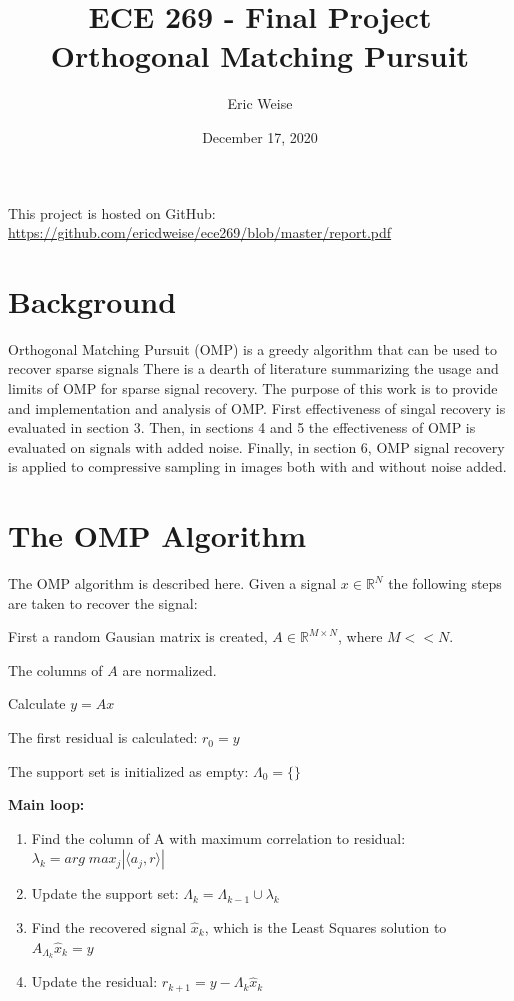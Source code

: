 \documentclass{article}
\title{ECE 269 - Final Project\\Orthogonal Matching Pursuit}
\author{Eric Weise}
\date{December 17, 2020}
\begin{document}
\maketitle

This project is hosted on GitHub:
\url{https://github.com/ericdweise/ece269/blob/master/report.pdf}




\section{Background}



Orthogonal Matching Pursuit (OMP) is a greedy algorithm that can be used to recover sparse signals 
There is a dearth of literature summarizing the usage and limits of OMP for sparse signal recovery.
The purpose of this work is to provide and implementation and analysis of OMP.
First effectiveness of singal recovery is evaluated in section 3.
Then, in sections 4 and 5 the effectiveness of OMP is evaluated on signals with added noise.
Finally, in section 6, OMP signal recovery is applied to compressive sampling in images both with and without noise added.



\section{The OMP Algorithm}
The OMP algorithm is described here.
Given a signal $x \in \mathbb{R}^N$ the following steps are taken to recover the signal:

First a random Gausian matrix is created, $A \in \mathbb{R}^{M \times N}$, where $M<<N$.

The columns of $A$ are normalized.

Calculate $y = Ax$

The first residual is calculated: $r_0 = y$

The support set is initialized as empty: $\Lambda_0 = \{\}$

{\bf Main loop:}
\hspace{15px}
\begin{enumerate}[leftmargin=2cm,labelsep=0cm,align=left]
    \item Find the column of A with maximum correlation to residual: $\lambda_k = arg\;max_j |\langle a_j, r \rangle|$
    \item Update the support set: $\Lambda_k = \Lambda_{k-1} \cup \lambda_k$
    \item Find the recovered signal $\hat{x}_k$, which is the Least Squares solution to $A_{\Lambda_k}\hat{x}_k = y$
    \item Update the residual: $r_{k+1} = y - \Lambda_k \hat{x}_k$
\end{enumerate}
\end{document}
